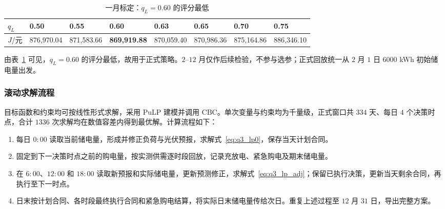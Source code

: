 \begin{table}[!htbp]
  \centering\small
  \setlength{\tabcolsep}{3pt}
  \caption{一月标定：$q_L=0.60$ 的评分最低}
  \label{tab:q3_jan}


  \begin{tabular}{llllllll}
    \toprule

    \rowcolor{headerblue}
    $q_L$ 
    & 0.50 
    & 0.55 
    & \textbf{0.60} 
    & 0.63 
    & 0.65 
    & 0.70 
    & 0.75 \\

    \midrule

    $J$/元 
    & 876,970.04 
    & 871,583.66 
    & \textbf{869,919.88} 
    & 870,059.40 
    & 870,986.36 
    & 875,164.86 
    & 886,346.10 \\

    \bottomrule
  \end{tabular}
\end{table}

由表~\ref{tab:q3_jan} 可见，$q_L=0.60$ 的评分最低，故用于正式策略。$2$--$12$ 月仅作后续检验，不参与选参；正式回放统一从 $2$ 月 $1$ 日 $6000$ kWh 初始储电量出发。

\subsubsection{滚动求解流程}

目标函数和约束均可按线性形式求解，采用 PuLP 建模并调用 CBC。单次变量与约束均为千量级，正式窗口共 $334$ 天、每日 $4$ 个决策时点，合计 $1336$ 次求解均在数值容差内得到最优解。计算流程如下：
\begin{enumerate}[leftmargin=2em,itemsep=2pt,topsep=2pt]
  \item {}每日 $0{:}00$ 读取当前储电量，形成并修正负荷与光伏预报，求解式~\eqref{eq:q3_lp0}，保存当天计划合同。
  \item {}固定到下一决策时点之前的购电量，按实测供需逐时段回放，记录充放电、紧急购电及期末储电量。
  \item {}在 $6{:}00$、$12{:}00$ 和 $18{:}00$ 读取新预报和实际储电量，更新预测修正，求解式~\eqref{eq:q3_lp_adj}；保留已执行决策，更新当天剩余合同，再执行至下一时点。
  \item {}日末按计划合同、各时段最终执行合同和紧急购电结算，将实际日末储电量传给次日。重复上述过程至 $12$ 月 $31$ 日，导出完整方案。
\end{enumerate}

